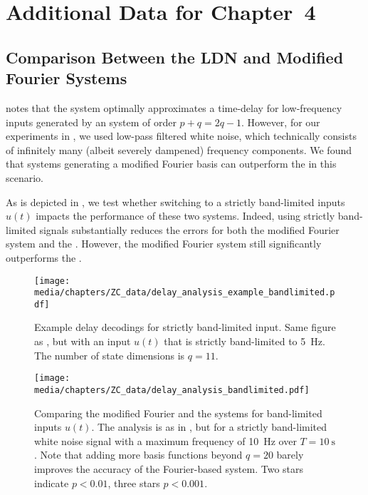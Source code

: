 
\section{Additional Data for Chapter~4}
\label{app:data_chp4}

\subsection{Comparison Between the LDN and Modified Fourier Systems}
\label{sec:ldn_mfn_basis_bandlimit}

 notes that the \LDN system optimally approximates a time-delay for low-frequency inputs generated by an \LTI system of order $p + q = 2q - 1$.
However, for our experiments in , we used low-pass filtered white noise, which technically consists of infinitely many (albeit severely dampened) frequency components.
We found that \LTI systems generating a modified Fourier basis can outperform the \LDN in this scenario.

As is depicted in , we test whether switching to a strictly band-limited inputs $u(t)$ impacts the performance of these two systems.
Indeed, using strictly band-limited signals substantially reduces the errors for both the modified Fourier system and the \LDN.
However, the modified Fourier system still significantly outperforms the \LDN.

\vspace{0.125cm}

\begin{figure}[h]
	\centering
	\texttt{[image: media/chapters/ZC\_data/delay\_analysis\_example\_bandlimited.pdf]}
	\caption[Example delay decodings for strictly bandlimited input]{Example delay decodings for strictly band-limited input.
	Same figure as , but with an input $u(t)$ that is strictly band-limited to \SI{5}{\hertz}.
	The number of state dimensions is $q = 11$.
	}
	\label{fig:delay_analysis_example_bandlimited}
\end{figure}

\begin{figure}[h]
	\centering
	\texttt{[image: media/chapters/ZC\_data/delay\_analysis\_bandlimited.pdf]}
	\caption[Comparing the modified Fourier and the LDN systems for band-limited inputs]{Comparing the modified Fourier and the \LDN systems for band-limited inputs $u(t)$. The analysis is as in , but for a strictly band-limited white noise signal with a maximum frequency of \SI{10}{\hertz} over $T = \SI{10}{\second}$.
	Note that adding more basis functions beyond $q = 20$ barely improves the accuracy of the Fourier-based system.
	Two stars indicate $p < 0.01$, three stars $p < 0.001$.}
	\label{fig:delay_analysis_bandlimited}
\end{figure}


